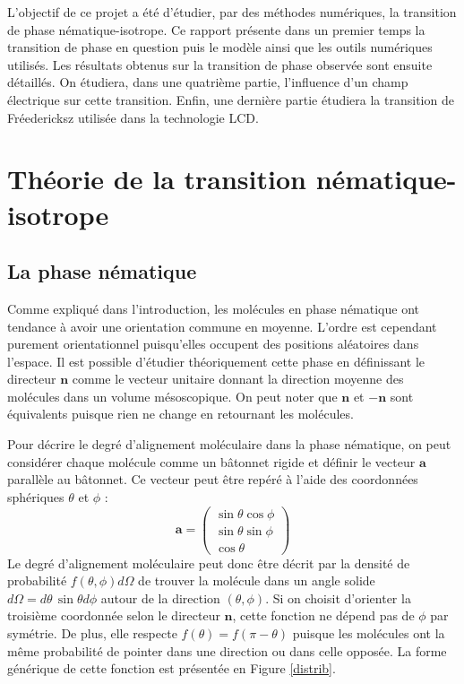 \documentclass[11pt]{article}
\numberwithin{equation}{section}
\begin{document}
L'objectif de ce projet a été d'étudier, par des méthodes numériques, la transition de phase nématique-isotrope. Ce rapport présente dans un premier temps la transition de phase en question puis le modèle ainsi que les outils numériques utilisés. Les résultats obtenus sur la transition de phase observée sont ensuite détaillés. On étudiera, dans une quatrième partie, l'influence d'un champ électrique sur cette transition. Enfin, une dernière partie étudiera la transition de Fréedericksz utilisée dans la technologie LCD.

\section{Théorie de la transition nématique-isotrope}
\subsection{La phase nématique}
Comme expliqué dans l'introduction, les molécules en phase nématique ont tendance à avoir une orientation commune en moyenne. L'ordre est cependant purement orientationnel puisqu'elles occupent des positions aléatoires dans l'espace. Il est possible d’étudier théoriquement cette phase en définissant le directeur $\bm{n}$ comme le vecteur unitaire donnant la direction moyenne des molécules dans un volume mésoscopique. On peut noter que $\bm{n}$ et $-\bm{n}$ sont équivalents puisque rien ne change en retournant les molécules.
\medskip

Pour décrire le degré d'alignement moléculaire dans la phase nématique, on peut considérer chaque molécule comme un bâtonnet rigide et définir le vecteur $\bm{a}$ parallèle au bâtonnet. Ce vecteur peut être repéré à l'aide des coordonnées sphériques $\theta$ et $\phi$ :
\begin{equation}
\bm{a} =
\begin{pmatrix}
 \sin \theta \cos \phi \\
 \sin \theta \sin \phi \\
 \cos \theta 
 \end{pmatrix} 
\end{equation}
Le degré d'alignement moléculaire peut donc être décrit par la densité de probabilité $f(\theta,\phi)d\Omega$ de trouver la molécule dans un angle solide $d\Omega = d\theta\, \sin \theta d\phi$ autour de la direction $(\theta,\phi)$. Si on choisit d'orienter la troisième coordonnée selon le directeur $\bm{n}$, cette fonction ne dépend pas de $\phi$ par symétrie. De plus, elle respecte $f(\theta) = f(\pi - \theta)$ puisque les molécules ont la même probabilité de pointer dans une direction ou dans celle opposée. La forme générique de cette fonction est présentée en Figure \ref{distrib}.
\vspace{1cm}
\end{document}
